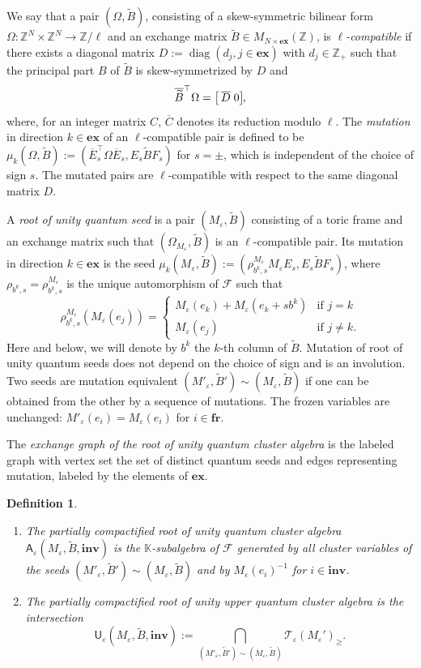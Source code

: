 \documentclass[11pt]{amsart}
\theoremstyle{plain}
\newtheorem{definition}[theorem]{Definition}
\newcommand \bde[1] { \begin{definition}\label{d#1}\rm }
\newcommand {\ede} { \end{definition} }
\def \KK {{\mathbb C}}
\def \KK {{\mathbb K}}
\def \Zset {{\mathbb Z}}
\def \A {{\boldsymbol{\mathsf A}}}
\def \U {{\boldsymbol{\mathsf U}}}
\def \B  {{\widetilde{B}}}
\newcommand \ex {{\mathbf{ex}}}
\newcommand \fr {{\mathbf{fr}}}
\newcommand \inv {{\mathbf{inv}}}
\def \TT {{\mathcal{T}}}
\def \FF {{\mathcal{F}}}
\def \ep {\varepsilon}
\def \ol {\overline}
\DeclareMathOperator \diag { {\mathrm{diag}} }
\begin{document}
We say that a pair $(\Omega, \B)$, consisting of a skew-symmetric bilinear form  $\Omega  : \Zset^N \times \Zset^N \to \Zset/ \ell$ and an exchange matrix $\B \in M_{N \times \ex}(\Zset)$,
is {\em{$\ell$-compatible}} if there exists a diagonal matrix $D := \diag(d_j, j \in \ex)$ with $d_j \in \Zset_+$ 
such that the principal part $B$ of $\B$ is skew-symmetrized by $D$ and 
\begin{equation}
\label{compatible}
\ol{\B}^\top \Omega  = 
\begin{bmatrix}
\, \ol{D} \; 0
\end{bmatrix} \hspace{-0.1cm},
\end{equation}
where, for an integer matrix $C$, $\ol{C}$ denotes its reduction modulo $\ell$.
The \emph{mutation} in direction $k \in \ex$ of an $\ell$-compatible pair is defined to be $\mu_k ( \Omega, \B) := ( \ol{E}_s^\top \Omega \ol{E}_s, E_s \B F_s)$ for $s= \pm$, which is independent of the choice of sign $s$. The mutated pairs are $\ell$-compatible with respect to the same diagonal matrix $D$. 

A {\em root of unity quantum seed} is a pair $(M_\ep, \B)$ consisting of a toric frame and an exchange matrix such that $(\Omega_{M_\ep},\B)$ is an $\ell$-compatible pair. 
Its mutation in direction $k\in\ex$ is the seed
$\mu_k(M_\ep, \B) := (\rho^{ M_\ep}_{b^k, s} M_\ep E_s,  E_s \B F_s)$, where $\rho_{b^k,s}=\rho^{M_\ep}_{b^k,s}$ is the unique automorphism of $\FF$ such that 
\[ 
\rho_{b^k, s}^{M_\ep}(M_\ep(e_j)) = 
\begin{cases}
M_\ep(e_k) + M_\ep(e_k + sb^k) & \text{if } j=k \\
M_\ep(e_j)                & \text{if } j \neq k.
\end{cases}
\]
Here and below, we will denote by $b^k$ the $k$-th column of $\B$.
Mutation of root of unity quantum seeds does not depend on the choice of sign and is an involution. 
Two seeds are mutation equivalent $(M'_\ep, \B') \sim (M_\ep, \B)$ if one can be obtained from the other by a sequence of mutations. The frozen variables are unchanged: 
$M'_\ep(e_i) = M_\ep(e_i)$ for $i \in \fr$.

The {\em{exchange graph of the root of unity quantum cluster algebra}} is the labeled graph with vertex set the set of distinct quantum seeds and edges representing mutation, labeled by the elements of $\ex$.

\bde{rootunitqCA}
\hfill
\begin{enumerate}
\item[(i)]
The {\em partially compactified root of unity quantum cluster algebra} $\A_\ep(M_\ep, \B, \inv)$ is the $\KK$-subalgebra of $\FF$ 
generated by all cluster variables of the seeds $(M'_\ep, \B') \sim (M_\ep, \B)$ and by 
$M_\ep(e_i)^{-1}$ for $i \in \inv$.
\item[(ii)] The 
\emph{partially compactified root of unity upper quantum cluster algebra} is the intersection 
\[
\U_\ep(M_\ep, \B, \inv) := \bigcap_{ (M'_\ep, \B') \sim (M_\ep, \B)} \TT_\ep(M_\ep')_{\geq}.
\]
\end{enumerate}
\ede
\end{document}

